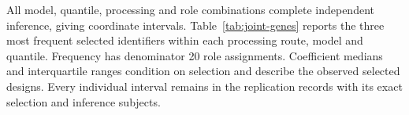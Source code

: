 All \JointGeneRoles{} model, quantile, processing and role combinations
complete independent inference, giving \JointGeneIntervals{}
coordinate intervals.
Table~\ref{tab:joint-genes} reports the three most frequent selected
identifiers within each processing route, model and quantile.
Frequency has denominator 20 role assignments. Coefficient medians
and interquartile ranges condition on selection and describe the
observed selected designs. Every individual interval remains in
the replication records with its exact selection and inference
subjects.

\begingroup\small

\endgroup



